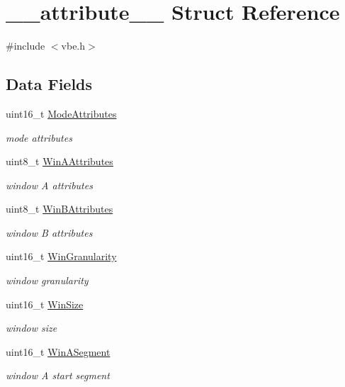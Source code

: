 \hypertarget{struct____attribute____}{}\section{\+\_\+\+\_\+attribute\+\_\+\+\_\+ Struct Reference}
\label{struct____attribute____}


{\ttfamily \#include $<$vbe.\+h$>$}

\subsection*{Data Fields}
\begin{DoxyCompactItemize}
\item 
uint16\+\_\+t \hyperlink{group__vbe_gad7593abf9d201ce5e59de60baba548cd}{Mode\+Attributes}
\begin{DoxyCompactList}\small\item\em mode attributes \end{DoxyCompactList}\item 
uint8\+\_\+t \hyperlink{group__vbe_gaaa90049ea7f03763acbbf75240f4f5d8}{Win\+A\+Attributes}
\begin{DoxyCompactList}\small\item\em window A attributes \end{DoxyCompactList}\item 
uint8\+\_\+t \hyperlink{group__vbe_ga370ddeb84e904ef1000fe57905ebf6b8}{Win\+B\+Attributes}
\begin{DoxyCompactList}\small\item\em window B attributes \end{DoxyCompactList}\item 
uint16\+\_\+t \hyperlink{group__vbe_ga38f205f799c6929629395f03e24de077}{Win\+Granularity}
\begin{DoxyCompactList}\small\item\em window granularity \end{DoxyCompactList}\item 
uint16\+\_\+t \hyperlink{group__vbe_ga78985f1c5ae166cb560099273cc558b4}{Win\+Size}
\begin{DoxyCompactList}\small\item\em window size \end{DoxyCompactList}\item 
uint16\+\_\+t \hyperlink{group__vbe_ga99b747099fd4d4271b0f0bc29f31c48f}{Win\+A\+Segment}
\begin{DoxyCompactList}\small\item\em window A start segment \end{DoxyCompactList}\item 

\end{DoxyCompactItemize}
